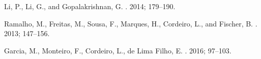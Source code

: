 \documentclass{llncs}
\begin{document}
\begin{thebibliography}{25}
Li, P., Li, G., and Gopalakrishnan, G.
.
 2014; 179--190.







Ramalho, M., Freitas, M., Sousa, F., Marques, H., Cordeiro, L., and Fischer, B.
.
 2013; 147--156.


Garcia, M., Monteiro, F., Cordeiro, L., de Lima Filho, E. 
. 
 2016; 97--103.



\end{thebibliography}
\end{document}
